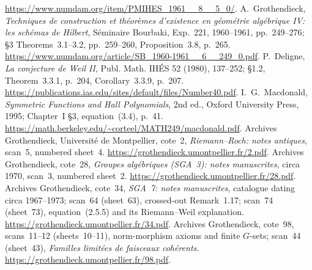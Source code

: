 \url{https://www.numdam.org/item/PMIHES_1961__8__5_0/}.
 A.~Grothendieck, \emph{Techniques de construction et th\'eor\`emes
d'existence en g\'eom\'etrie alg\'ebrique IV: les sch\'emas de Hilbert},
S\'eminaire Bourbaki, Exp.~221, 1960--1961, pp.~249--276;
\S3 Theorems~3.1--3.2, pp.~259--260, Proposition~3.8, p.~265.
\url{https://www.numdam.org/article/SB_1960-1961__6__249_0.pdf}.
 P.~Deligne, \emph{La conjecture de Weil II}, Publ. Math. IH\'ES 52
(1980), 137--252; \S1.2, Theorem~3.3.1, p.~204, Corollary~3.3.9, p.~207.
\url{https://publications.ias.edu/sites/default/files/Number40.pdf}.
 I.~G.~Macdonald, \emph{Symmetric Functions and Hall Polynomials},
2nd ed., Oxford University Press, 1995; Chapter~I \S3, equation~(3.4), p.~41.
\url{https://math.berkeley.edu/~corteel/MATH249/macdonald.pdf}.
 Archives Grothendieck, Universit\'e de Montpellier, cote~2,
\emph{Riemann--Roch: notes antiques}, scan~5, numbered sheet~4.
\url{https://grothendieck.umontpellier.fr/2.pdf}.
 Archives Grothendieck, cote~28, \emph{Groupes alg\'ebriques
(SGA~3): notes manuscrites}, circa 1970, scan~3, numbered sheet~2.
\url{https://grothendieck.umontpellier.fr/28.pdf}.
 Archives Grothendieck, cote~34,
\emph{SGA~7: notes manuscrites}, catalogue dating circa 1967--1973;
scan~64 (sheet~63), crossed-out Remark~1.17; scan~74 (sheet~73),
equation~(2.5.5) and its Riemann--Weil explanation.
\url{https://grothendieck.umontpellier.fr/34.pdf}.
 Archives Grothendieck, cote~98, scans~11--12 (sheets~10--11),
norm-morphism axioms and finite $G$-sets; scan~44 (sheet~43),
\emph{Familles limit\'ees de faisceaux coh\'erents}.
\url{https://grothendieck.umontpellier.fr/98.pdf}.
